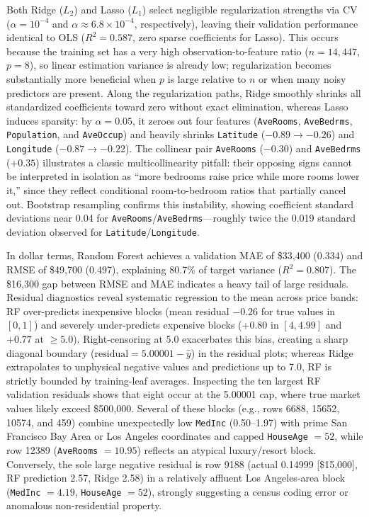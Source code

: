 Both Ridge ($L_2$) and Lasso ($L_1$) select negligible regularization strengths via CV ($\alpha = 10^{-4}$ and $\alpha \approx 6.8 \times 10^{-4}$, respectively), leaving their validation performance identical to OLS ($R^2 = 0.587$, zero sparse coefficients for Lasso). This occurs because the training set has a very high observation-to-feature ratio ($n = 14{,}447$, $p = 8$), so linear estimation variance is already low; regularization becomes substantially more beneficial when $p$ is large relative to $n$ or when many noisy predictors are present. Along the regularization paths, Ridge smoothly shrinks all standardized coefficients toward zero without exact elimination, whereas Lasso induces sparsity: by $\alpha = 0.05$, it zeroes out four features (\texttt{AveRooms}, \texttt{AveBedrms}, \texttt{Population}, and \texttt{AveOccup}) and heavily shrinks \texttt{Latitude} ($-0.89 \to -0.26$) and \texttt{Longitude} ($-0.87 \to -0.22$). The collinear pair \texttt{AveRooms} ($-0.30$) and \texttt{AveBedrms} ($+0.35$) illustrates a classic multicollinearity pitfall: their opposing signs cannot be interpreted in isolation as ``more bedrooms raise price while more rooms lower it,'' since they reflect conditional room-to-bedroom ratios that partially cancel out. Bootstrap resampling confirms this instability, showing coefficient standard deviations near 0.04 for \texttt{AveRooms}/\texttt{AveBedrms}---roughly twice the 0.019 standard deviation observed for \texttt{Latitude}/\texttt{Longitude}.


In dollar terms, Random Forest achieves a validation MAE of \$33,400 (0.334) and RMSE of \$49,700 (0.497), explaining 80.7\% of target variance ($R^2 = 0.807$). The \$16,300 gap between RMSE and MAE indicates a heavy tail of large residuals. Residual diagnostics reveal systematic regression to the mean across price bands: RF over-predicts inexpensive blocks (mean residual $-0.26$ for true values in $[0, 1]$) and severely under-predicts expensive blocks ($+0.80$ in $[4, 4.99]$ and $+0.77$ at $\ge 5.0$). Right-censoring at 5.0 exacerbates this bias, creating a sharp diagonal boundary ($\text{residual} = 5.00001 - \hat{y}$) in the residual plots; whereas Ridge extrapolates to unphysical negative values and predictions up to 7.0, RF is strictly bounded by training-leaf averages. Inspecting the ten largest RF validation residuals shows that eight occur at the 5.00001 cap, where true market values likely exceed \$500,000. Several of these blocks (e.g., rows 6688, 15652, 10574, and 459) combine unexpectedly low \texttt{MedInc} (0.50--1.97) with prime San Francisco Bay Area or Los Angeles coordinates and capped \texttt{HouseAge} $= 52$, while row 12389 (\texttt{AveRooms} $= 10.95$) reflects an atypical luxury/resort block. Conversely, the sole large negative residual is row 9188 (actual 0.14999 [\$15,000], RF prediction 2.57, Ridge 2.58) in a relatively affluent Los Angeles-area block (\texttt{MedInc} $= 4.19$, \texttt{HouseAge} $= 52$), strongly suggesting a census coding error or anomalous non-residential property.


